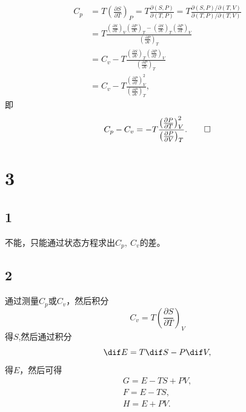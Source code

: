\documentclass[12pt]{article}
\begin{document}
\begin{align}
	C_{p} & =T\left(\frac{\partial S}{\partial T}\right)_{P}=T \frac{\partial(S, P)}{\partial(T, P)}=T \frac{\partial(S, P) / \partial(T, V)}{\partial(T, P) / \partial(T, V)}                                                                                  \\
	      & =T \frac{\left(\frac{\partial S}{\partial T}\right)_{V}\left(\frac{\partial P}{\partial V}\right)_{T}-\left(\frac{\partial S}{\partial V}\right)_{T}\left(\frac{\partial P}{\partial T}\right)_{V}}{\left(\frac{\partial P}{\partial V}\right)_{T}} \\
	      & =C_{v}-T \frac{\left(\frac{\partial S}{\partial V}\right)_{T}\left(\frac{\partial P}{\partial T}\right)_{V}}{\left(\frac{\partial P}{\partial V}\right)_{T}}                                                                                        \\
	      & =C_v - T  \frac{\left(\frac{\partial P}{\partial T}\right)_{V}^2}{\left(\frac{\partial P}{\partial V}\right)_{T}},
\end{align}
即
\begin{equation}
	C_{p} - C_v = - T  \frac{\left(\frac{\partial P}{\partial T}\right)_{V}^2}{\left(\frac{\partial P}{\partial V}\right)_{T}}.\qed
\end{equation}

\section{3}

\subsection{1}

不能，只能通过状态方程求出$C_p,\ C_v$的差。

\subsection{2}

通过测量$C_p$或$C_v$，然后积分
\begin{equation}
	C_v = T \left(\frac{\partial S}{\partial T}\right)_V
\end{equation}
得$S$,然后通过积分
\begin{equation}
	\dif E = T \dif S - P \dif V,
\end{equation}
得$E$，然后可得
\begin{gather}
	G = E-TS+PV,\\
	F=E-TS,\\
	H=E+PV.
\end{gather}
\end{document}
